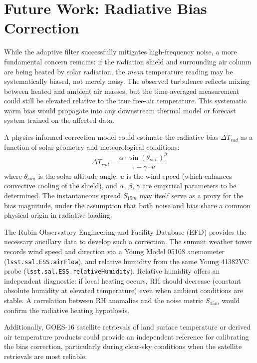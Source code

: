 \documentclass{article}
\begin{document}
\section{Future Work: Radiative Bias Correction}

While the adaptive filter successfully mitigates high-frequency noise, a more fundamental concern remains: if the radiation shield and surrounding air column are being heated by solar radiation, the \textit{mean} temperature reading may be systematically biased, not merely noisy. The observed turbulence reflects mixing between heated and ambient air masses, but the time-averaged measurement could still be elevated relative to the true free-air temperature. This systematic warm bias would propagate into any downstream thermal model or forecast system trained on the affected data.

A physics-informed correction model could estimate the radiative bias $\Delta T_{rad}$ as a function of solar geometry and meteorological conditions:
\begin{equation}
    \Delta T_{rad} = \frac{\alpha \cdot \sin(\theta_{sun})^{\beta}}{1 + \gamma \cdot u}
\end{equation}
where $\theta_{sun}$ is the solar altitude angle, $u$ is the wind speed (which enhances convective cooling of the shield), and $\alpha$, $\beta$, $\gamma$ are empirical parameters to be determined. The instantaneous spread $S_{15m}$ may itself serve as a proxy for the bias magnitude, under the assumption that both noise and bias share a common physical origin in radiative loading.

The Rubin Observatory Engineering and Facility Database (EFD) provides the necessary ancillary data to develop such a correction. The summit weather tower records wind speed and direction via a Young Model 05108 anemometer (\texttt{lsst.sal.ESS.airFlow}), and relative humidity from the same Young 41382VC probe (\texttt{lsst.sal.ESS.relativeHumidity}). Relative humidity offers an independent diagnostic: if local heating occurs, RH should decrease (constant absolute humidity at elevated temperature) even when ambient conditions are stable. A correlation between RH anomalies and the noise metric $S_{15m}$ would confirm the radiative heating hypothesis.

Additionally, GOES-16 satellite retrievals of land surface temperature or derived air temperature products could provide an independent reference for calibrating the bias correction, particularly during clear-sky conditions when the satellite retrievals are most reliable.
\end{document}
